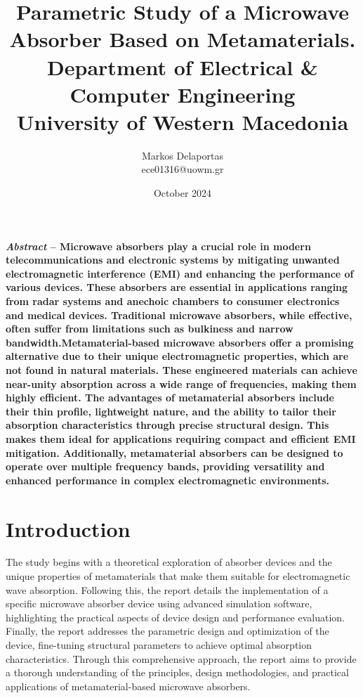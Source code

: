 \documentclass[12pt]{report}
\title{ \textsf{Parametric Study of a Microwave Absorber Based on Metamaterials.}\\
    \textsf{\Large Department of Electrical \& Computer Engineering}\\
    \textsf{\large University of Western Macedonia}
} \author{\textsf{Markos Delaportas} \\ ece01316@uowm.gr}
\date{\textsf{October 2024}}
\begin{document}
\maketitle

\textbf{ \textit{Abstract} -- Microwave absorbers play a crucial role in modern
    telecommunications and electronic systems by mitigating unwanted electromagnetic
    interference (EMI) and enhancing the performance of various devices. These absorbers are
    essential in applications ranging from radar systems and anechoic chambers to consumer
    electronics and medical devices. Traditional microwave absorbers, while effective, often
    suffer from limitations such as bulkiness and narrow bandwidth.Metamaterial-based
    microwave absorbers offer a promising alternative due to their unique electromagnetic
    properties, which are not found in natural materials. These engineered materials can
    achieve near-unity absorption across a wide range of frequencies, making them highly
    efficient. The advantages of metamaterial absorbers include their thin profile,
    lightweight nature, and the ability to tailor their absorption characteristics through
    precise structural design. This makes them ideal for applications requiring compact and
    efficient EMI mitigation. Additionally, metamaterial absorbers can be designed to operate
    over multiple frequency bands, providing versatility and enhanced performance in complex
    electromagnetic environments.}

{\let\clearpage\relax \tableofcontents} \thispagestyle{empty}    


\section{\textsf{Introduction}}
    The study begins with a theoretical exploration of absorber devices and the unique
    properties of metamaterials that make them suitable for electromagnetic wave absorption.
    Following this, the report details the implementation of a specific microwave absorber
    device using advanced simulation software, highlighting the practical aspects of device
    design and performance evaluation. Finally, the report addresses the parametric design and
    optimization of the device, fine-tuning structural parameters to achieve optimal absorption
    characteristics. Through this comprehensive approach, the report aims to provide a thorough
    understanding of the principles, design methodologies, and practical applications of
    metamaterial-based microwave absorbers.





\printbibliography
\end{document}
